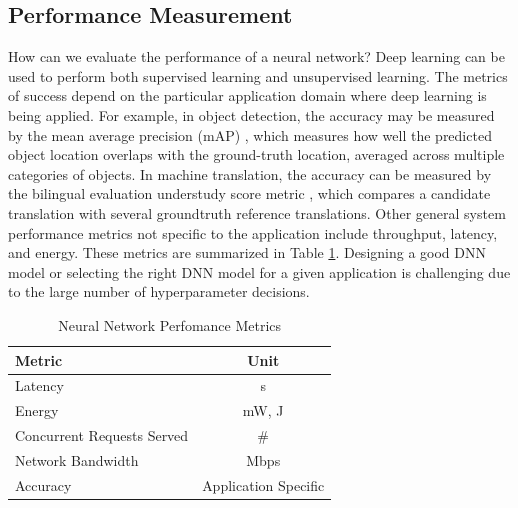 \subsection{Performance Measurement}
How can we evaluate the performance of a neural network?
Deep learning can be used to perform both supervised learning and unsupervised learning. The metrics of success depend on the particular application domain where deep learning is being applied. For example, in object detection, the accuracy may be measured by the mean average precision (mAP) \cite{ILSVRC15}, which measures how well the predicted object location overlaps with the ground-truth location, averaged across multiple categories of objects. In machine translation, the accuracy can be measured by the bilingual evaluation understudy score metric \cite{10.3115/1073083.1073135}, which compares a candidate translation with several groundtruth reference translations. 
Other general system performance metrics not specific to the application include throughput, latency, and energy. These metrics are summarized in Table \ref{tab:NN-Perfomance-Metrics}.
Designing a good DNN model or selecting the right DNN model for a given application is challenging due to the large number of hyperparameter decisions.

\begin{table}[htbp]
	\centering
	\begin{tabular}{|l||c|} 
	\hline 
	 Metric & Unit	\\
	\hline
	Latency  &	s	\\
	Energy	& mW, J	\\
	Concurrent Requests Served	&	\#  \\
	Network Bandwidth	& Mbps			  \\
	Accuracy & Application Specific		\\
	\hline
	\end{tabular}
	\caption{Neural Network Perfomance Metrics\label{tab:NN-Perfomance-Metrics}}
\end{table}

